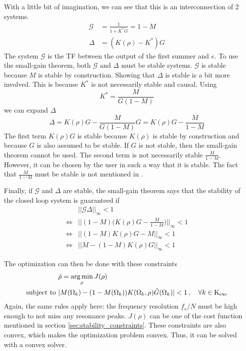 With a little bit of imagination, we can see that this is an interconnection of 2 systems.
\begin{align*}
\mathcal{G} &= \frac{1}{1+K^*G} = 1-M\\
\Delta &= (K(\rho)-K^*)G
\end{align*}
The system $\mathcal{G}$ is the TF between the output of the first summer and $e$. To use the small-gain theorem, both $\mathcal{G}$ and $\Delta$ must be stable systems. $\mathcal{G}$ is stable because $M$ is stable by construction. Showing that $\Delta$ is stable is a bit more involved. This is because $K^*$ is not necessarily stable and causal. Using
\begin{equation*}
K^* = \frac{M}{G(1-M)}
\end{equation*}
we can expand $\Delta$
\begin{equation*}
\Delta = K(\rho) G - \frac{M}{G(1-M)} G = K(\rho) G - \frac{M}{1-M}
\end{equation*}
The first term $K(\rho) G$ is stable because $K(\rho)$ is stable by construction and because $G$ is also assumed to be stable. If $G$ is not stable, then the small-gain theorem cannot be used. The second term is not necessarily stable $\frac{M}{1-M}$. However, it can be chosen by the user in such a way that it is stable. The fact that $\frac{M}{1-M}$ must be stable is not mentioned in \cite[Lemma 1]{Data-driven_model_reference_control}. 

Finally, if $\mathcal{G}$ and $\Delta$ are stable, the small-gain theorem says that the stability of the closed loop system is guaranteed if
\begin{align*}
&||\mathcal{G}\Delta||_\infty < 1 \\
\Leftrightarrow & \Big|\Big|(1-M) \big(K(\rho) G - \frac{M}{1-M}\big)\Big|\Big|_\infty < 1 \\
\Leftrightarrow & ||(1-M)K(\rho)G - M||_\infty < 1\\
\Leftrightarrow & ||M -(1-M)K(\rho)G ||_\infty < 1
\end{align*}

The optimization can then be done with these constraints
\begin{align*}
	&\hat{\rho} = \underset{\rho}{\mathrm{arg\,min}} \, J(\rho) \\
	\text{subject to } &|M(\Omega_k) -(1-M(\Omega_k))K(\Omega_k,\rho)\hat{G}(\Omega_k)| < 1 \,, \quad \forall k \in \text{K}_{\text{exc}}
\end{align*}
Again, the same rules apply here: the frequency resolution $f_s/N$ must be high enough to not miss any resonance peaks. $J(\rho)$ can be one of the cost function mentioned in section \ref{sec:stability_constraints}. These constraints are also convex, which makes the optimization problem convex. Thus, it can be solved with a convex solver.

